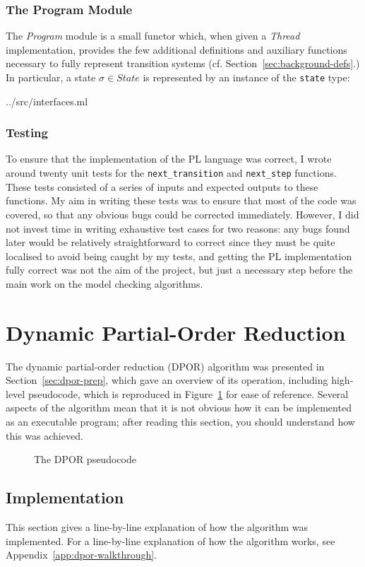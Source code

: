 \documentclass[12pt,a4paper,twoside,openright]{report}
\begin{document}
\subsubsection{The Program Module}
The \emph{Program} module is a small functor which,
when given a \emph{Thread} implementation, provides 
the few additional definitions and auxiliary
functions necessary to fully represent
transition systems (cf. Section~\ref{sec:background-defs}.)
In particular, a state $\sigma \in \textit{State}$ is
represented by an instance of the \texttt{state} type:

	{../src/interfaces.ml}

\subsubsection{Testing}
To ensure that the implementation of the PL
language was correct, I wrote around twenty unit tests for
the \texttt{next\_transition} and
\texttt{next\_step} functions. These tests
consisted of a series of inputs and expected outputs
to these functions. My aim in writing these tests
was to ensure that most of the code was covered,
so that any obvious bugs could be corrected
immediately. However, I did not invest time
in writing exhaustive test cases for two reasons:
any bugs found later would be relatively straightforward
to correct since they must be quite localised to avoid
being caught by my tests, and getting the PL implementation
fully correct was not the aim of the project, but
just a necessary step before the main work on the
model checking algorithms.


\section{Dynamic Partial-Order Reduction}
The dynamic partial-order reduction (DPOR)
algorithm was presented in Section~\ref{sec:dpor-prep},
which gave an overview of its operation,
including high-level pseudocode, which is reproduced
in Figure~\ref{fig:dpor-imp-pscode} for ease
of reference. Several
aspects of the algorithm mean that it
is not obvious how it can be implemented
as an executable program; after reading
this section, you should understand
how this was achieved.

\begin{figure}
	\dporpseudocode
	\caption{The DPOR pseudocode}
	\label{fig:dpor-imp-pscode}
\end{figure}

\subsection{Implementation}
This section gives a
line-by-line explanation of how the algorithm
was implemented.
For a line-by-line explanation of how the algorithm
works, see Appendix~\ref{app:dpor-walkthrough}.
\end{document}
